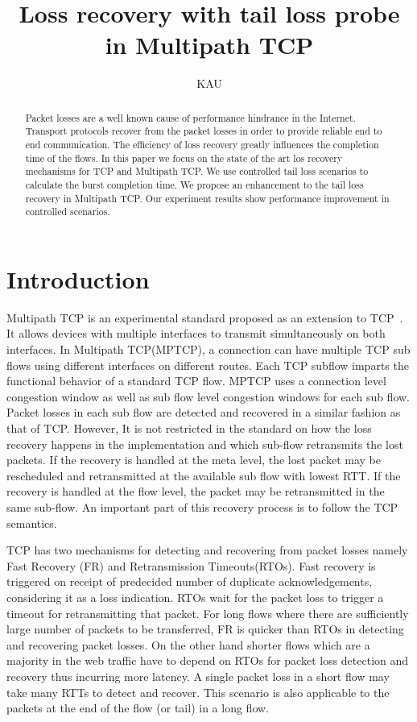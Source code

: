 \documentclass[10pt,draftcls,twocolumn]{IEEEconf}
\title{Loss recovery with tail loss probe in Multipath TCP}
\author{KAU}
\begin{document}
\maketitle

\begin{abstract}
Packet losses are a well known cause of performance hindrance in the Internet. Transport protocols recover from the packet losses in order to provide reliable end to end communication. The efficiency
of loss recovery greatly influences the completion time of the flows. In this paper we focus on the state of the art los recovery mechanisms for TCP and Multipath TCP. We use controlled tail loss scenarios
to calculate the burst completion time. We propose an enhancement to the tail loss recovery in Multipath TCP. Our experiment results show performance improvement in controlled scenarios. 
\end{abstract}

\section{Introduction}


Multipath TCP is an experimental standard proposed as an extension to TCP~\cite{rfc6824}. It allows devices with multiple interfaces to transmit simultaneously on both interfaces.  
In Multipath TCP(MPTCP), a connection can have multiple TCP sub flows using different interfaces on different routes. Each TCP subflow imparts the functional behavior of a standard TCP flow. 
MPTCP uses a connection level congestion window as well as sub flow level congestion windows for each sub flow. Packet losses in each sub flow are detected and recovered in a similar fashion as that of TCP. However, It is not restricted in the standard on how the loss recovery happens in the implementation and which sub-flow retransmits the lost packets. If the recovery is handled at the meta level, the lost packet may be rescheduled and retransmitted at the available sub flow with lowest RTT. If the recovery is handled at the flow level, the packet may be retransmitted in the same sub-flow. An important part of this recovery process is to follow the TCP semantics. 

TCP has two mechanisms for detecting and recovering from packet losses namely Fast Recovery (FR) and Retransmission Timeouts(RTOs). Fast recovery is triggered on receipt of predecided number of duplicate acknowledgements, considering it as a loss indication. RTOs wait for the packet loss to trigger a timeout for retransmitting that packet. For long flows where there are sufficiently large number of packets to be transferred, FR is quicker than RTOs in detecting and recovering packet losses. On the other hand shorter flows which are a majority in the web traffic have to depend on RTOs for packet loss detection and recovery thus incurring more latency. A single packet loss in a short flow may take many RTTs to detect and recover. This scenario is also applicable to the packets at the end of the flow (or tail) in a long flow.
\end{document}
